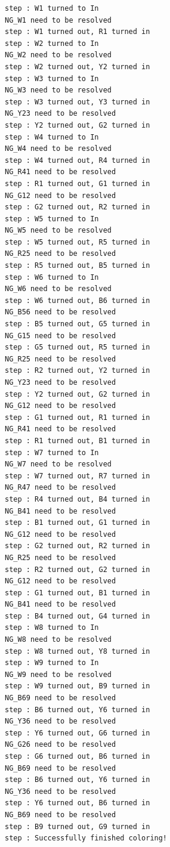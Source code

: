 \documentclass[uplatex]{jsarticle}
\begin{document}
\begin{lstlisting}[basicstyle=\ttfamily\footnotesize, frame=single]
step : W1 turned to In
NG_W1 need to be resolved
step : W1 turned out, R1 turned in
step : W2 turned to In
NG_W2 need to be resolved
step : W2 turned out, Y2 turned in
step : W3 turned to In
NG_W3 need to be resolved
step : W3 turned out, Y3 turned in
NG_Y23 need to be resolved
step : Y2 turned out, G2 turned in
step : W4 turned to In
NG_W4 need to be resolved
step : W4 turned out, R4 turned in
NG_R41 need to be resolved
step : R1 turned out, G1 turned in
NG_G12 need to be resolved
step : G2 turned out, R2 turned in
step : W5 turned to In
NG_W5 need to be resolved
step : W5 turned out, R5 turned in
NG_R25 need to be resolved
step : R5 turned out, B5 turned in
step : W6 turned to In
NG_W6 need to be resolved
step : W6 turned out, B6 turned in
NG_B56 need to be resolved
step : B5 turned out, G5 turned in
NG_G15 need to be resolved
step : G5 turned out, R5 turned in
NG_R25 need to be resolved
step : R2 turned out, Y2 turned in
NG_Y23 need to be resolved
step : Y2 turned out, G2 turned in
NG_G12 need to be resolved
step : G1 turned out, R1 turned in
NG_R41 need to be resolved
step : R1 turned out, B1 turned in
step : W7 turned to In
NG_W7 need to be resolved
step : W7 turned out, R7 turned in
NG_R47 need to be resolved
step : R4 turned out, B4 turned in
NG_B41 need to be resolved
step : B1 turned out, G1 turned in
NG_G12 need to be resolved
step : G2 turned out, R2 turned in
NG_R25 need to be resolved
step : R2 turned out, G2 turned in
NG_G12 need to be resolved
step : G1 turned out, B1 turned in
NG_B41 need to be resolved
step : B4 turned out, G4 turned in
step : W8 turned to In
NG_W8 need to be resolved
step : W8 turned out, Y8 turned in
step : W9 turned to In
NG_W9 need to be resolved
step : W9 turned out, B9 turned in
NG_B69 need to be resolved
step : B6 turned out, Y6 turned in
NG_Y36 need to be resolved
step : Y6 turned out, G6 turned in
NG_G26 need to be resolved
step : G6 turned out, B6 turned in
NG_B69 need to be resolved
step : B6 turned out, Y6 turned in
NG_Y36 need to be resolved
step : Y6 turned out, B6 turned in
NG_B69 need to be resolved
step : B9 turned out, G9 turned in
step : Successfully finished coloring!
\end{lstlisting}
\end{document}
